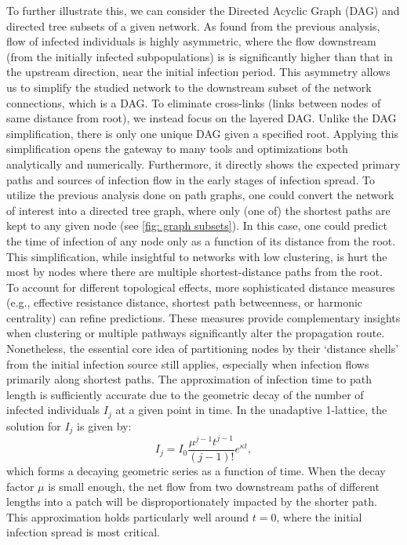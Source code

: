 To further illustrate this, we can consider the Directed Acyclic Graph (DAG) and directed tree subsets of a given network. As found from the previous analysis, flow of infected individuals is highly asymmetric, where the flow downstream (from the initially infected subpopulations) is is significantly higher than that in the upstream direction, near the initial infection period. This asymmetry allows us to simplify the studied network to the downstream subset of the network connections, which is a DAG. To eliminate cross-links (links between nodes of same distance from root), we instead focus on the layered DAG. Unlike the DAG simplification, there is only one unique DAG given a specified root. Applying this simplification opens the gateway to many tools and optimizations both analytically and numerically. Furthermore, it directly shows the expected primary paths and sources of infection flow in the early stages of infection spread. To utilize the previous analysis done on path graphs, one could convert the network of interest into a directed tree graph, where only (one of) the shortest paths are kept to any given node (see \ref{fig: graph subsets}). In this case, one could predict the time of infection of any node only as a function of its distance from the root. This simplification, while insightful to networks with low clustering, is hurt the most by nodes where there are multiple shortest-distance paths from the root. \\

To account for different topological effects, more sophisticated distance measures (e.g., effective resistance distance, shortest path betweenness, or harmonic centrality) can refine predictions. These measures provide complementary insights when clustering or multiple pathways significantly alter the propagation route. Nonetheless, the essential core idea of partitioning nodes by their ‘distance shells’ from the initial infection source still applies, especially when infection flows primarily along shortest paths. The approximation of infection time to path length is sufficiently accurate due to the geometric decay of the number of infected individuals $I_j$ at a given point in time. In the unadaptive 1-lattice, the solution for $I_j$ is given by:
\[
I_j = I_0 \frac{\mu^{j-1} t^{j-1}}{(j-1)!} e^{\kappa t},
\]
which forms a decaying geometric series as a function of time. When the decay factor $\mu$ is small enough, the net flow from two downstream paths of different lengths into a patch will be disproportionately impacted by the shorter path. This approximation holds particularly well around $t=0$, where the initial infection spread is most critical.

